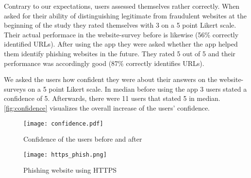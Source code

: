 \begin{description}[leftmargin=0cm]
	\item[User Self-Assessment:] Contrary to our expectations, users assessed themselves rather correctly. When asked for their ability of distinguishing legitimate from fraudulent websites at the beginning of the study they rated themselves with 3 on a 5 point Likert scale.
Their actual performace in the website-survey before is likewise (56\% correctly identified URLs). After using the app they were asked whether the app helped them identify phishing websites in the future. They rated 5 out of 5 and their performance was accordingly good (87\% correctly identifies URLs).
	\item[Confidence:] We asked the users how confident they were about their answers on the website-surveys on a 5 point Likert scale. In median before using the app 3 users stated a confidence of 5. Afterwards, there were 11 users that stated 5 in median. \autoref{fig:confidence} visualizes the overall increase of the users' confidence.
	\begin{figure}
		\centering
		\texttt{[image: confidence.pdf]}
		\caption{Confidence of the users before and after}
		\label{fig:confidence}
		\end{figure}
\end{description}
\begin{figure}
	\centering
	\texttt{[image: https\_phish.png]}
	\caption{Phishing website using HTTPS~\cite{phishtank}}
	\label{fig:https_phish}
	\end{figure}
	
